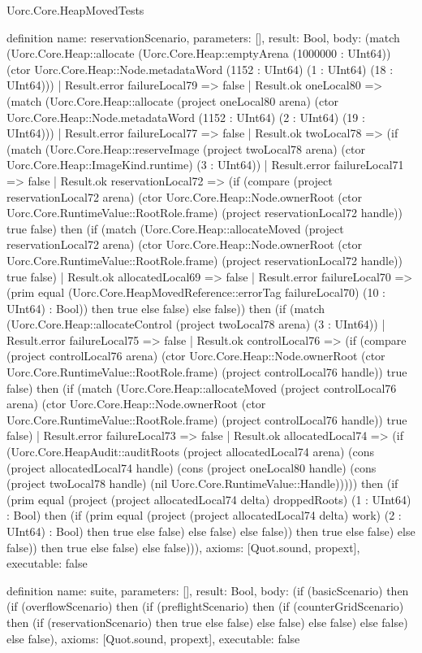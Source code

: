 \begin{lexlean}{Uorc.Core.HeapMovedTests}
\begin{semanticmodule}
definition{
  name: reservationScenario,
  parameters: [],
  result: Bool,
  body: (match (Uorc.Core.Heap::allocate (Uorc.Core.Heap::emptyArena (1000000 : UInt64)) (ctor Uorc.Core.Heap::Node.metadataWord (1152 : UInt64) (1 : UInt64) (18 : UInt64)))
    | Result.error failureLocal79 => false
    | Result.ok oneLocal80 => (match (Uorc.Core.Heap::allocate (project oneLocal80 arena) (ctor Uorc.Core.Heap::Node.metadataWord (1152 : UInt64) (2 : UInt64) (19 : UInt64)))
      | Result.error failureLocal77 => false
      | Result.ok twoLocal78 => (if (match (Uorc.Core.Heap::reserveImage (project twoLocal78 arena) (ctor Uorc.Core.Heap::ImageKind.runtime) (3 : UInt64))
        | Result.error failureLocal71 => false
        | Result.ok reservationLocal72 => (if (compare (project reservationLocal72 arena) (ctor Uorc.Core.Heap::Node.ownerRoot (ctor Uorc.Core.RuntimeValue::RootRole.frame) (project reservationLocal72 handle)) true false) then (if (match (Uorc.Core.Heap::allocateMoved (project reservationLocal72 arena) (ctor Uorc.Core.Heap::Node.ownerRoot (ctor Uorc.Core.RuntimeValue::RootRole.frame) (project reservationLocal72 handle)) true false)
          | Result.ok allocatedLocal69 => false
          | Result.error failureLocal70 => (prim equal (Uorc.Core.HeapMovedReference::errorTag failureLocal70) (10 : UInt64) : Bool)) then true else false) else false)) then (if (match (Uorc.Core.Heap::allocateControl (project twoLocal78 arena) (3 : UInt64))
        | Result.error failureLocal75 => false
        | Result.ok controlLocal76 => (if (compare (project controlLocal76 arena) (ctor Uorc.Core.Heap::Node.ownerRoot (ctor Uorc.Core.RuntimeValue::RootRole.frame) (project controlLocal76 handle)) true false) then (if (match (Uorc.Core.Heap::allocateMoved (project controlLocal76 arena) (ctor Uorc.Core.Heap::Node.ownerRoot (ctor Uorc.Core.RuntimeValue::RootRole.frame) (project controlLocal76 handle)) true false)
          | Result.error failureLocal73 => false
          | Result.ok allocatedLocal74 => (if (Uorc.Core.HeapAudit::auditRoots (project allocatedLocal74 arena) (cons (project allocatedLocal74 handle) (cons (project oneLocal80 handle) (cons (project twoLocal78 handle) (nil Uorc.Core.RuntimeValue::Handle))))) then (if (prim equal (project (project allocatedLocal74 delta) droppedRoots) (1 : UInt64) : Bool) then (if (prim equal (project (project allocatedLocal74 delta) work) (2 : UInt64) : Bool) then true else false) else false) else false)) then true else false) else false)) then true else false) else false))),
  axioms: [Quot.sound, propext],
  executable: false
}

definition{
  name: suite,
  parameters: [],
  result: Bool,
  body: (if (basicScenario) then (if (overflowScenario) then (if (preflightScenario) then (if (counterGridScenario) then (if (reservationScenario) then true else false) else false) else false) else false) else false),
  axioms: [Quot.sound, propext],
  executable: false
}
\end{semanticmodule}
\end{lexlean}
